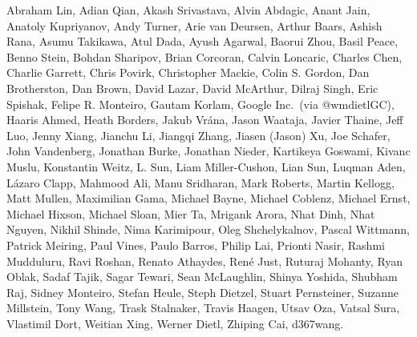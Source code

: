 Abraham Lin,
Adian Qian,
Akash Srivastava,
Alvin Abdagic,
Anant Jain,
Anatoly Kupriyanov,
Andy Turner,
Arie van Deursen,
Arthur Baars,
Ashish Rana,
Asumu Takikawa,
Atul Dada,
Ayush Agarwal,
Baorui Zhou,
Basil Peace,
Benno Stein,
Bohdan Sharipov,
Brian Corcoran,
Calvin Loncaric,
Charles Chen,
Charlie Garrett,
Chris Povirk,
Christopher Mackie,
Colin S. Gordon,
Dan Brotherston,
Dan Brown,
David Lazar,
David McArthur,
Dilraj Singh,
Eric Spishak,
Felipe R. Monteiro,
Gautam Korlam,
Google Inc.\ (via @wmdietlGC),
Haaris Ahmed,
Heath Borders,
Jakub Vr\'ana,
Jason Waataja,
Javier Thaine,
Jeff Luo,
Jenny Xiang,
Jianchu Li,
Jiangqi Zhang,
Jiasen (Jason) Xu,
Joe Schafer,
John Vandenberg,
Jonathan Burke,
Jonathan Nieder,
Kartikeya Goswami,
Kivanc Muslu,
Konstantin Weitz,
L. Sun,
Liam Miller-Cushon,
Lian Sun,
Luqman Aden,
L\'azaro Clapp,
Mahmood Ali,
Manu Sridharan,
Mark Roberts,
Martin Kellogg,
Matt Mullen,
Maximilian Gama,
Michael Bayne,
Michael Coblenz,
Michael Ernst,
Michael Hixson,
Michael Sloan,
Mier Ta,
Mrigank Arora,
Nhat Dinh,
Nhat Nguyen,
Nikhil Shinde,
Nima Karimipour,
Oleg Shchelykalnov,
Pascal Wittmann,
Patrick Meiring,
Paul Vines,
Paulo Barros,
Philip Lai,
Prionti Nasir,
Rashmi Mudduluru,
Ravi Roshan,
Renato Athaydes,
Ren\'e Just,
Ruturaj Mohanty,
Ryan Oblak,
Sadaf Tajik,
Sagar Tewari,
Sean McLaughlin,
Shinya Yoshida,
Shubham Raj,
Sidney Monteiro,
Stefan Heule,
Steph Dietzel,
Stuart Pernsteiner,
Suzanne Millstein,
Tony Wang,
Trask Stalnaker,
Travis Haagen,
Utsav Oza,
Vatsal Sura,
Vlastimil Dort,
Weitian Xing,
Werner Dietl,
Zhiping Cai,
d367wang.
